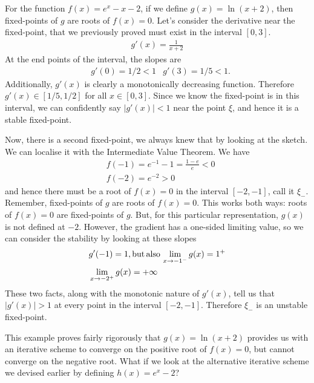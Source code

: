 \exemple{\upline}
	{
	For the function $f(x) = e^x - x - 2$, if we define $g(x)=\ln(x+2)$, then fixed-points of $g$ are roots of $f(x)=0$. Let's consider the derivative near the fixed-point, that we previously proved must exist in the interval $[0,3]$.
	\begin{align*}
	g'(x) = \frac{1}{x+2}
	\end{align*}
	At the end points of the interval, the slopes are
	\begin{align*}
	& g'(0) = 1/2 < 1
	& g'(3) = 1/5 < 1.
	\end{align*}
	Additionally, $g'(x)$ is clearly a monotonically decreasing function. Therefore $g'(x) \in [1/5, 1/2]$ for all $x\in[0,3]$. Since we know the fixed-point is in this interval, we can confidently say $|g'(x)|<1$ near the point $\xi$, and hence it is a stable fixed-point.
	
	Now, there is a second fixed-point, we always knew that by looking at the sketch. We can localise it with the Intermediate Value Theorem. We have
	\begin{align*}
	&f(-1) = e^{-1} - 1 = \frac{1-e}{e} < 0 \\
	&f(-2) = e^{-2} > 0
	\end{align*}
	and hence there must be a root of $f(x)=0$ in the interval $[-2,-1]$, call it $\xi_-$. Remember, fixed-points of $g$ are roots of $f(x)=0$. This works both ways: roots of $f(x)=0$ are fixed-points of $g$. But, for this particular representation, $g(x)$ is not defined at $-2$. However, the gradient has a one-sided limiting value, so we can consider the stability by looking at these slopes
	\begin{align*}
	& g'(-1) = 1, {\rm but \, also \,} \lim_{x\to -1^-}g(x)=1^+\\
	& \lim_{x\to -2^+}g(x)=+\infty
	\end{align*}
	These two facts, along with the monotonic nature of $g'(x)$, tell us that $|g'(x)|>1$ at every point in the interval $[-2,-1]$. Therefore $\xi_-$ is an unstable fixed-point.
	}
{\downline}

This example proves fairly rigorously that $g(x)=\ln(x+2)$ provides us with an iterative scheme to converge on the positive root of $f(x)=0$, but cannot converge on the negative root. What if we look at the alternative iterative scheme we devised earlier by defining $h(x)=e^x - 2$?

